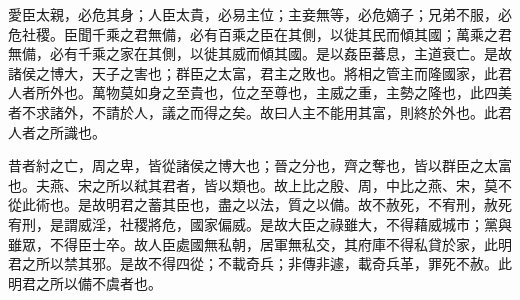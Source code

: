 
\begin{pinyinscope}
愛臣太親，必危其身；人臣太貴，必易主位；主妾無等，必危嫡子；兄弟不服，必危社稷。臣聞千乘之君無備，必有百乘之臣在其側，以徙其民而傾其國；萬乘之君無備，必有千乘之家在其側，以徙其威而傾其國。是以姦臣蕃息，主道衰亡。是故諸侯之博大，天子之害也；群臣之太富，君主之敗也。將相之管主而隆國家，此君人者所外也。萬物莫如身之至貴也，位之至尊也，主威之重，主勢之隆也，此四美者不求諸外，不請於人，議之而得之矣。故曰人主不能用其富，則終於外也。此君人者之所識也。

昔者紂之亡，周之卑，皆從諸侯之博大也；晉之分也，齊之奪也，皆以群臣之太富也。夫燕、宋之所以弒其君者，皆以類也。故上比之殷、周，中比之燕、宋，莫不從此術也。是故明君之蓄其臣也，盡之以法，質之以備。故不赦死，不宥刑，赦死宥刑，是謂威淫，社稷將危，國家偏威。是故大臣之祿雖大，不得藉威城市；黨與雖眾，不得臣士卒。故人臣處國無私朝，居軍無私交，其府庫不得私貸於家，此明君之所以禁其邪。是故不得四從；不載奇兵；非傳非遽，載奇兵革，罪死不赦。此明君之所以備不虞者也。


\end{pinyinscope}